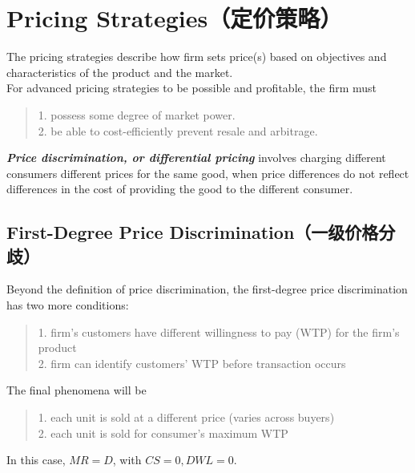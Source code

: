 \section{Pricing Strategies（定价策略）}
The pricing strategies describe how firm sets price(s) based on objectives and characteristics of the product and the market. \\
For advanced pricing strategies to be possible and profitable, the firm must
\begin{quote}
    1. possess some degree of market power. \\
    2. be able to cost-efficiently prevent resale and arbitrage.    
\end{quote}
\begin{definition}
    \textbf{\textit{Price discrimination, or differential pricing}} involves charging different consumers different prices for the same good, when price differences do not reflect differences in the cost of providing the good to the different consumer.
\end{definition}

\subsection{First-Degree Price Discrimination（一级价格分歧）}
Beyond the definition of price discrimination, the first-degree price discrimination has two more conditions:
\begin{quote}
    1. firm's customers have different willingness to pay (WTP) for the firm's product \\
    2. firm can identify customers' WTP before transaction occurs
\end{quote}
The final phenomena will be
\begin{quote}
    1. each unit is sold at a different price (varies across buyers) \\
    2. each unit is sold for consumer's maximum WTP
\end{quote}
In this case, $MR = D$, with $CS = 0, DWL = 0$.

